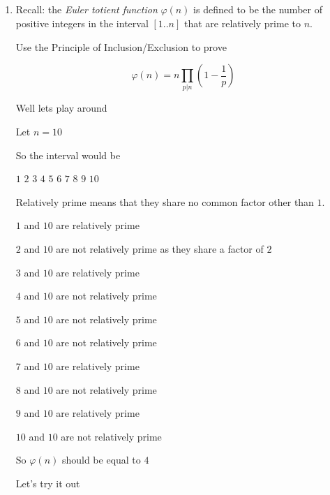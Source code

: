 \documentclass[10pt, AMS Euler]{article}
\begin{document}
	
	\\

    \\
	
	\noindent \underline{\hspace{2in}}\\
	
	\\
	
	
	
	
	\begin{enumerate}

 
	    \newpage	
		\item Recall: the \emph{Euler totient function} $\varphi(n)$ is defined to be the number of positive integers in the interval $[1..n]$ that are relatively prime to $n$. 
  
		Use the Principle of Inclusion/Exclusion to prove 
  
		$$ \varphi(n) = n \prod_{p | n}\left(1-\frac{1}{p}\right) $$

        Well lets play around

        Let $n=10$

        So the interval would be 

        $1$ $2$ $3$ $4$ $5$ $6$ $7$ $8$ $9$ $10$

        Relatively prime means that they share no common factor other than $1$.

        $1$ and $10$ are relatively prime

        $2$ and $10$ are not relatively prime as they share a factor of $2$

        $3$ and $10$ are relatively prime

        $4$ and $10$ are not relatively prime

        $5$ and $10$ are not relatively prime

        $6$ and $10$ are not relatively prime

        $7$ and $10$ are relatively prime

        $8$ and $10$ are not relatively prime

        $9$ and $10$ are relatively prime

        $10$ and $10$ are not relatively prime

        So $\varphi(n)$ should be equal to $4$

        Let's try it out


\end{enumerate}
\end{document}
